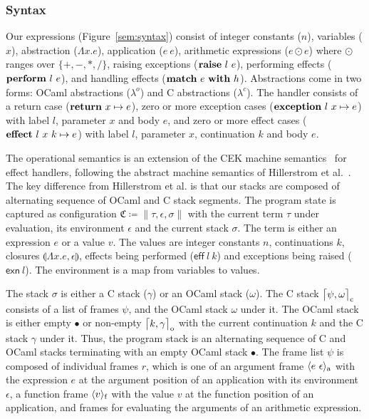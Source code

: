 \documentclass[sigplan,screen]{acmart}
\newcommand{\lam}[2]{\Lambda #1. #2}
\newcommand{\env}{\epsilon}
\newcommand{\clos}[3]{\llparenthesis \lam{#1}{#2}, #3 \rrparenthesis}
\newcommand{\kw}[1]{\text{\bf #1}}
\newcommand{\effval}[2]{\textsf{eff} ~#1 ~#2}
\newcommand{\exnval}[1]{\textsf{exn} ~#1}
\newcommand{\handle}[2]{\kw{match} ~#1 ~\kw{with} ~#2}
\newcommand{\throw}[2]{\kw{raise} ~#1 ~#2}
\newcommand{\perform}[2]{\kw{perform} ~#1 ~#2}
\newcommand{\caseval}[2]{\kw{return}~#1 \mapsto #2}
\newcommand{\caseexn}[3]{\kw{exception} ~#1 ~#2 \mapsto #3}
\newcommand{\caseeff}[4]{\kw{effect} ~#1 ~#2 ~#3 \mapsto #4}
\newcommand{\farg}[2]{\langle #1 ~#2 \rangle_{\text a}}
\newcommand{\ffun}[1]{\langle #1 \rangle_{\text f}}
\newcommand{\fl}{\psi} %
\newcommand{\cstack}{\gamma} %
\newcommand{\ostack}{\omega} %
\newcommand{\cstacka}[2]{\big \lceil #1, #2 \big \rceil_{\text c}} %
\newcommand{\ostacka}[2]{\big \lceil #1, #2 \big \rceil_{\text o}} %
\newcommand{\ostackemp}{\bullet}
\newcommand{\stack}{\sigma}
\newcommand{\config}{\mathfrak{C}}
\newcommand{\configa}[3]{\|#1,#2,#3\|}
\begin{document}
\subsubsection{Syntax} Our expressions (Figure~\ref{sem:syntax}) consist of
integer constants ($n$), variables ($x$), abstraction ($\lam{x}{e}$),
application ($e~e$), arithmetic expressions ($e \odot e$) where $\odot$ ranges
over $\{+,-,*,/\}$, raising exceptions ($\throw{l}{e}$), performing effects
($\perform{l}{e}$), and handling effects ($\handle{e}{h}$). Abstractions come
in two forms: OCaml abstractions ($\lambda^o$) and C abstractions
($\lambda^c$). The handler consists of a return case ($\caseval{x}{e}$), zero
or more exception cases ($\caseexn{l}{x}{e}$) with label $l$, parameter $x$ and
body $e$, and zero or more effect cases ($\caseeff{l}{x}{k}{e}$) with label
$l$, parameter $x$, continuation $k$ and body $e$.

The operational semantics is an extension of the CEK machine
semantics~\cite{Felleisen86} for effect handlers, following the abstract
machine semantics of Hillerstrom et al.~\cite{Hillerstrom20}. The key
difference from Hillerstrom et al. is that our stacks are composed of
alternating sequence of OCaml and C stack segments. The program state is
captured as configuration $\config \coloneqq \configa{\tau}{\env}{\stack}$ with
the current term $\tau$ under evaluation, its environment $\env$ and the
current stack $\stack$. The term is either an expression $e$ or a value $v$.
The values are integer constants $n$, continuations $k$, closures
$\clos{x}{e}{\env}$, effects being performed ($\effval{l}{k}$) and exceptions
being raised ($\exnval{l}$). The environment is a map from variables to values.

The stack $\stack$ is either a C stack ($\cstack$) or an OCaml stack
($\ostack$). The C stack $\cstacka{\fl}{\ostack}$ consists of a list of
frames $\fl$, and the OCaml stack $\ostack$ under it. The OCaml stack is
either empty $\ostackemp$ or non-empty $\ostacka{k}{\cstack}$ with the current
continuation $k$ and the C stack $\cstack$ under it. Thus, the program stack is
an alternating sequence of C and OCaml stacks terminating with an empty OCaml
stack $\ostackemp$. The frame list $\fl$ is composed of individual frames $r$,
which is one of an argument frame $\farg{e}{\env}$ with the expression $e$ at
the argument position of an application with its environment $\env$, a function
frame $\ffun{v}$ with the value $v$ at the function position of an application,
and frames for evaluating the arguments of an arithmetic expression.
\end{document}
